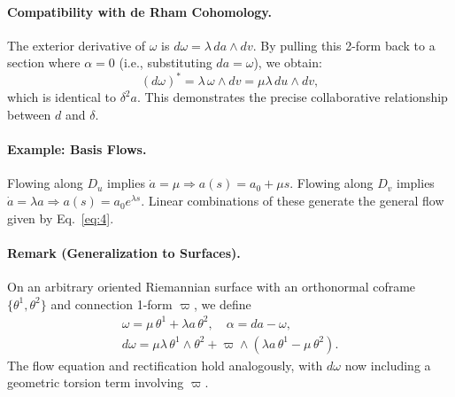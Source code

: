 \paragraph{Compatibility with de Rham Cohomology.}
The exterior derivative of $\omega$ is $d\omega = \lambda\,da\wedge dv$. By pulling this 2-form back to a section where $\alpha=0$ (i.e., substituting $da=\omega$), we obtain:
\[
(d\omega)^* = \lambda\,\omega\wedge dv = \mu\lambda\,du\wedge dv,
\]
which is identical to $\delta^2 a$. This demonstrates the precise collaborative relationship between $d$ and $\delta$.

\paragraph{Example: Basis Flows.}
Flowing along $D_u$ implies $\dot{a} = \mu \Rightarrow a(s) = a_0 + \mu s$. Flowing along $D_v$ implies $\dot{a} = \lambda a \Rightarrow a(s) = a_0 e^{\lambda s}$. Linear combinations of these generate the general flow given by Eq.~\eqref{eq:4}.

\paragraph{Remark (Generalization to Surfaces).}
On an arbitrary oriented Riemannian surface with an orthonormal coframe $\{\theta^1, \theta^2\}$ and connection 1-form $\varpi$, we define
\begin{gather}
\omega=\mu\,\theta^1+\lambda a\,\theta^2, \quad \alpha=da-\omega, \label{eq:18} \tag{18-19} \\
d\omega=\mu\lambda\,\theta^1\wedge\theta^2+\varpi\wedge(\lambda a\,\theta^1-\mu\,\theta^2). \nonumber
\end{gather}
The flow equation and rectification hold analogously, with $d\omega$ now including a geometric torsion term involving $\varpi$.
